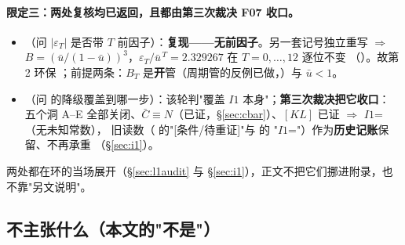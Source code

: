 \paragraph{限定三：两处复核均已返回，且都由第三次裁决 F07 收口。}\LT
\begin{itemize}
\item {}（问 $|\varepsilon_T|$ 是否带 $T$ 前因子）：\textbf{复现——无前因子}。另一套记号独立重写
$\Rightarrow$ $B=(\bar u/(1-\bar u))^3$，$\varepsilon_T/\bar u^{\,T}=2.329267$ 在 $T=0,\dots,12$ 逐位不变
（）。故第 2 环保 \LT；前提两条：$B_T$ 是\textbf{开}管（周期管的反例已做，）与 $\bar u<1$。
\item {}（问  的降级覆盖到哪一步）：该轮判"覆盖 $I1$ 本身"；\textbf{第三次裁决把它收口}：
五个洞 A--E 全部关闭、$\bar C\equiv N$（已证，\S\ref{sec:cbar}）、$[KL]$ 已证 $\Rightarrow$ $I1$=\LT{}（无未知常数），
旧读数（ 的"[条件/待重证]"与  的 "$I1$=\LC"）作为\textbf{历史记账}保留、不再承重
（\S\ref{sec:i1}）。
\end{itemize}
两处都在环的当场展开（\S\ref{sec:l1audit} 与 \S\ref{sec:i1}），正文不把它们挪进附录，也不靠"另文说明"。

\subsection{不主张什么（本文的"不是"）}\label{sec:not}

